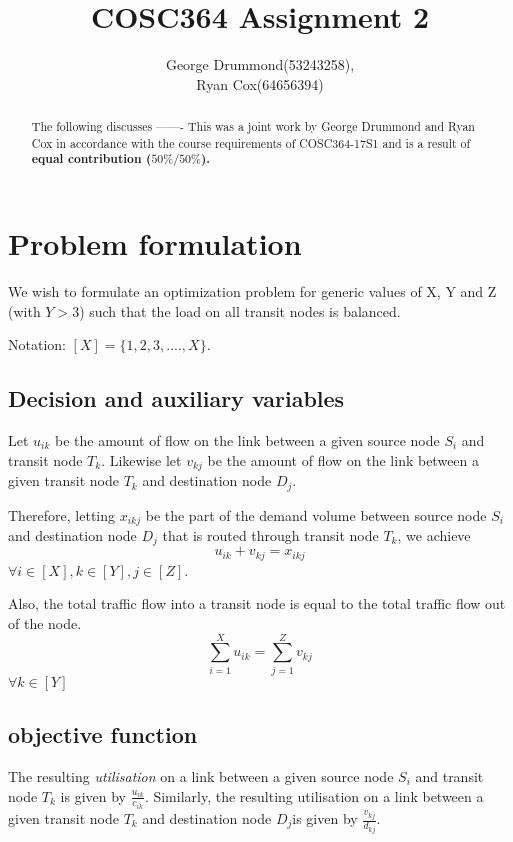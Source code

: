 \documentclass[12pt,twoside]{article}
\begin{document}
\title{COSC364 Assignment 2}
\author{George Drummond(53243258), \\Ryan Cox(64656394)}
\maketitle
\thispagestyle{empty}

\begin{abstract}
The following discusses -------
This was a joint work by George Drummond and Ryan Cox in accordance with the course requirements of COSC364-17S1 and is a result of \bf{equal} contribution ($50\% / 50\%$).
\end{abstract}

\tableofcontents

\newpage
\section{ Problem formulation}
We wish to formulate an optimization problem for generic values of X, Y and Z (with $ Y> 3$) such that the load on all transit nodes is balanced.

Notation: $[X] = \{1,2,3,....,X\}$.

\subsection{Decision and auxiliary variables}
Let $u_{ik}$ be the amount of flow on the link between a given source node $S_i$ and transit node $T_k$.
Likewise let $v_{kj}$ be the amount of flow on the link between a given transit node $T_k$ and destination node $D_j$.

Therefore, letting $x_{ikj}$ be the part of the demand volume between source node $S_i$ and destination node $D_j$ that is routed through transit node $T_k$, we achieve 
\begin{equation}\label{first}
	u_{ik} + v_{kj} = x_{ikj} 
\end{equation}
$\forall i \in [X], k \in [Y], j \in [Z]$.

Also, the total traffic flow into a transit node is equal to the total traffic flow out of the node.
\begin{equation}
	\sum_{i=1}^{X}u_{ik} = \sum_{j=1}^{Z}v_{kj}
\end{equation}
$\forall k \in [Y]$



\subsection{objective function}\label{Sec: objf}
The resulting \emph{utilisation} on a link between a given source node $S_i$ and transit node $T_k$ is given by $\frac{u_{ik}}{c_{ik}}$. Similarly, the resulting utilisation on a link between a given transit node $T_k$ and destination node $D_j$is given by $\frac{v_{kj}}{d_{kj}}$.
\end{document}
